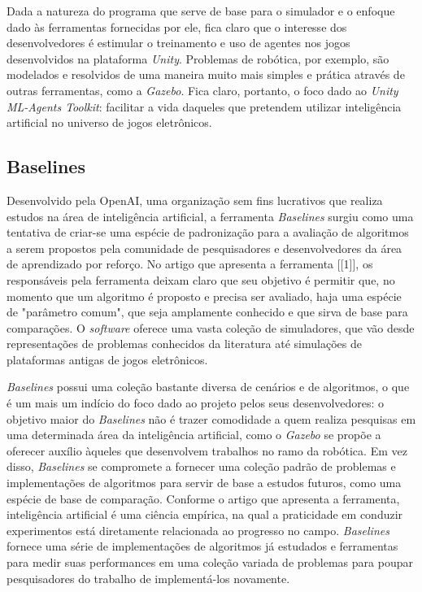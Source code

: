 \documentclass[cic,tc]{iiufrgs}
\begin{document}
Dada a natureza do programa que serve de base para o simulador e o enfoque dado
às ferramentas fornecidas por ele, fica claro que o interesse dos
desenvolvedores é estimular o treinamento e uso de agentes nos jogos
desenvolvidos na plataforma \textit{Unity}. Problemas de robótica, por exemplo,
são modelados e resolvidos de uma maneira muito mais simples e prática através
de outras ferramentas, como a \textit{Gazebo}. Fica claro, portanto, o foco dado
ao \textit{Unity ML-Agents Toolkit}: facilitar a vida daqueles que pretendem
utilizar inteligência artificial no universo de jogos eletrônicos.


\subsection{Baselines}
Desenvolvido pela OpenAI, uma organização sem fins lucrativos que realiza
estudos na área de inteligência artificial, a ferramenta \textit{Baselines}
surgiu como uma tentativa de criar-se uma espécie de padronização para a
avaliação de algoritmos a serem propostos pela comunidade de pesquisadores e
desenvolvedores da área de aprendizado por reforço. No artigo que apresenta a
ferramenta [[1]], os responsáveis pela ferramenta deixam claro que seu objetivo
é permitir que, no momento que um algoritmo é proposto e precisa ser avaliado,
haja uma espécie de "parâmetro comum", que seja amplamente conhecido e que sirva
de base para comparações. O \textit{software} oferece uma vasta coleção de
simuladores, que vão desde representações de problemas conhecidos da literatura
até simulações de plataformas antigas de jogos eletrônicos.


\textit{Baselines} possui uma coleção bastante diversa de cenários e de
algoritmos, o que é um mais um indício do foco dado ao projeto pelos seus
desenvolvedores: o objetivo maior do \textit{Baselines} não é trazer comodidade
a quem realiza pesquisas em uma determinada área da inteligência artificial,
como o \textit{Gazebo} se propõe a oferecer auxílio àqueles que desenvolvem
trabalhos no ramo da robótica. Em vez disso, \textit{Baselines} se compromete
a fornecer uma coleção padrão de problemas e implementações de algoritmos
para servir de base a estudos futuros, como uma espécie de base de comparação.
Conforme o artigo que apresenta a ferramenta, inteligência artificial é uma
ciência empírica, na qual a praticidade em conduzir experimentos está
diretamente relacionada ao progresso no campo. \textit{Baselines} fornece uma
série de implementações de algoritmos já estudados e ferramentas para medir
suas performances em uma coleção variada de problemas para poupar pesquisadores
do trabalho de implementá-los novamente.
\end{document}

